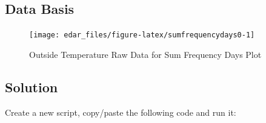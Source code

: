 \documentclass[
  a4paperpaper,
]{book}
\begin{document}
\hypertarget{data-basis-16}{%
\subsection{Data Basis}\label{data-basis-16}}

\begin{figure}
\texttt{[image: edar\_files/figure-latex/sumfrequencydays0-1]} \caption{Outside Temperature Raw Data for Sum Frequency Days Plot}\label{fig:sumfrequencydays0}
\end{figure}

\newpage

\hypertarget{solution-16}{%
\subsection{Solution}\label{solution-16}}

Create a new script, copy/paste the following code and run it:
\end{document}
